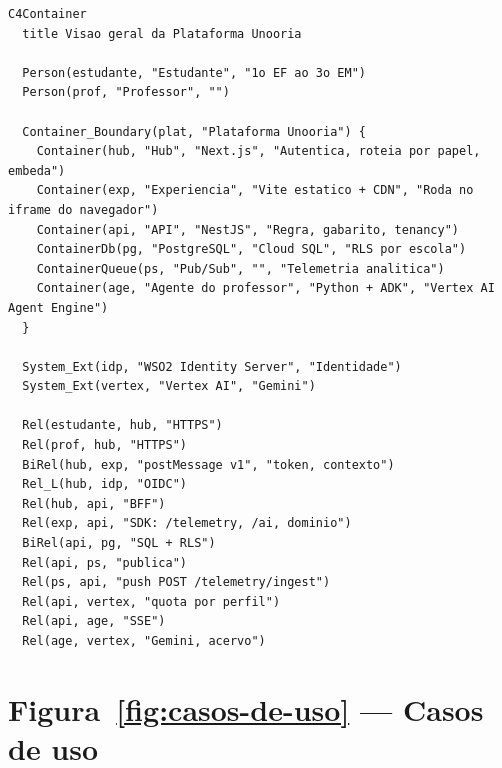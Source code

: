 \begin{lstlisting}[language=mermaid]
C4Container
  title Visao geral da Plataforma Unooria

  Person(estudante, "Estudante", "1o EF ao 3o EM")
  Person(prof, "Professor", "")

  Container_Boundary(plat, "Plataforma Unooria") {
    Container(hub, "Hub", "Next.js", "Autentica, roteia por papel, embeda")
    Container(exp, "Experiencia", "Vite estatico + CDN", "Roda no iframe do navegador")
    Container(api, "API", "NestJS", "Regra, gabarito, tenancy")
    ContainerDb(pg, "PostgreSQL", "Cloud SQL", "RLS por escola")
    ContainerQueue(ps, "Pub/Sub", "", "Telemetria analitica")
    Container(age, "Agente do professor", "Python + ADK", "Vertex AI Agent Engine")
  }

  System_Ext(idp, "WSO2 Identity Server", "Identidade")
  System_Ext(vertex, "Vertex AI", "Gemini")

  Rel(estudante, hub, "HTTPS")
  Rel(prof, hub, "HTTPS")
  BiRel(hub, exp, "postMessage v1", "token, contexto")
  Rel_L(hub, idp, "OIDC")
  Rel(hub, api, "BFF")
  Rel(exp, api, "SDK: /telemetry, /ai, dominio")
  BiRel(api, pg, "SQL + RLS")
  Rel(api, ps, "publica")
  Rel(ps, api, "push POST /telemetry/ingest")
  Rel(api, vertex, "quota por perfil")
  Rel(api, age, "SSE")
  Rel(age, vertex, "Gemini, acervo")
\end{lstlisting}

\section{Figura~\ref{fig:casos-de-uso} --- Casos de uso}

